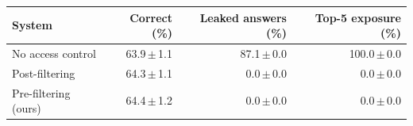 \begin{tabular}{lrrr}
\toprule
System & Correct (\%) & Leaked answers (\%) & Top-5 exposure (\%)\\
\midrule
No access control & 63.9\,$\pm$\,1.1 & 87.1\,$\pm$\,0.0 & 100.0\,$\pm$\,0.0\\
Post-filtering & 64.3\,$\pm$\,1.1 & 0.0\,$\pm$\,0.0 & 0.0\,$\pm$\,0.0\\
Pre-filtering (ours) & 64.4\,$\pm$\,1.2 & 0.0\,$\pm$\,0.0 & 0.0\,$\pm$\,0.0\\
\bottomrule
\end{tabular}
